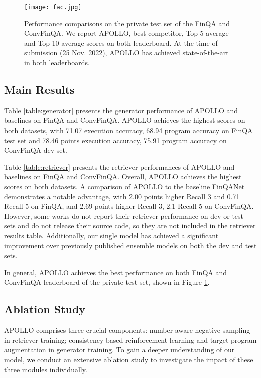 \documentclass[11pt]{article}
\begin{document}
\begin{figure}[]
    \centerline{\texttt{[image: fac.jpg]}}
    \caption{Performance comparisons on the private test set of the FinQA and ConvFinQA. We report APOLLO, best competitor, Top 5 average and Top 10 average scores on both leaderboard. At the time of submission (25 Nov. 2022), APOLLO has achieved state-of-the-art in both leaderboards. }
    \label{figure:private}
\end{figure}

\subsection{Main Results}

Table \ref{table:generator} presents the generator performance of APOLLO and baselines on FinQA and ConvFinQA. APOLLO achieves the highest scores on both datasets, with 71.07 execution accuracy, 68.94 program accuracy on FinQA test set and 78.46 points execution accuracy, 75.91 program accuracy on ConvFinQA dev set. 

Table \ref{table:retriever} presents the retriever performances of APOLLO and baselines on FinQA and ConvFinQA. Overall, APOLLO achieves the highest scores on both datasets. A comparison of APOLLO to the baseline FinQANet demonstrates a notable advantage, with 2.00 points higher Recall 3 and 0.71 Recall 5 on FinQA, and 2.69 points higher Recall 3, 2.1 Recall 5 on ConvFinQA. However, some works \cite{wang2022novel,wang2022numerical, dyrren} do not report their retriever performance on dev or test sets and do not release their source code, so they are not included in the retriever results table. Additionally, our single model has achieved a significant improvement over previously published ensemble models on both the dev and test sets.

In general, APOLLO achieves the best performance on both FinQA and ConvFinQA leaderboard of the private test set, shown in Figure \ref{figure:private}.




\subsection{Ablation Study}
APOLLO comprises three crucial components: number-aware negative sampling in retriever training; consistency-based reinforcement learning and target program augmentation in generator training. To gain a deeper understanding of our model, we conduct an extensive ablation study to investigate the impact of these three modules individually.
\end{document}
